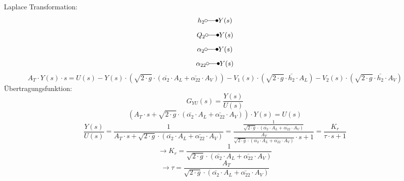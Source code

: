 Laplace Transformation: 
\[ h_2          \laplace Y(s) \]
\[ Q_2          \laplace Y(s) \]
\[ \alpha_2     \laplace Y(s) \]
\[ \alpha_{22}  \laplace Y(s) \]
\[ A_T \cdot Y(s) \cdot s = U(s) 
    - Y(s)   \cdot \left(\sqrt{2 \cdot g} \cdot (\bar{\alpha_2} \cdot A_L + \bar{\alpha_{22}} \cdot A_V)\right)
    - V_1(s) \cdot \left(\sqrt{2 \cdot g} \cdot \bar{h_2} \cdot A_L\right)
    - V_2(s) \cdot \left(\sqrt{2 \cdot g} \cdot \bar{h_2} \cdot A_V\right)
\]
Übertragungsfunktion: 
\[ G_{YU}(s) = \frac{Y(s)}{U(s)} \]
\[ \left(A_T \cdot s 
    + \sqrt{2 \cdot g} \cdot (\bar{\alpha_2} \cdot A_L + \bar{\alpha_{22}} \cdot A_V)\right) \cdot Y(s) = U(s) 
\]
\[ \frac{Y(s)}{U(s)} 
    = \frac{1}{A_T \cdot s + 
    \sqrt{2 \cdot g} \cdot (\bar{\alpha_2} \cdot A_L + \bar{\alpha_{22}} \cdot A_V)}
    = \frac{\frac{1}{\sqrt{2 \cdot g} \cdot (\bar{\alpha_2} \cdot A_L + \bar{\alpha_{22}} \cdot A_V)}}
    {\frac{A_T}{\sqrt{2 \cdot g} \cdot (\bar{\alpha_2} \cdot A_L + \bar{\alpha_{22}} \cdot A_V)} \cdot s + 1}
    = \frac{K_r}{\tau \cdot s + 1}
\]
\[ \to K_r = \frac{1}{\sqrt{2 \cdot g} \cdot (\bar{\alpha_2} \cdot A_L + \bar{\alpha_{22}} \cdot A_V)} \]
\[ \to \tau = \frac{A_T}{\sqrt{2 \cdot g} \cdot (\bar{\alpha_2} \cdot A_L + \bar{\alpha_{22}} \cdot A_V)} \]
